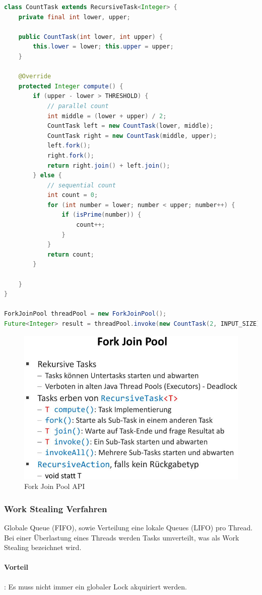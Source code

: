 \begin{lstlisting}[language=java]
class CountTask extends RecursiveTask<Integer> {
	private final int lower, upper; 
	
	public CountTask(int lower, int upper) {
		this.lower = lower; this.upper = upper;
	}
	
	@Override
	protected Integer compute() {
		if (upper - lower > THRESHOLD) { 
			// parallel count
			int middle = (lower + upper) / 2;
			CountTask left = new CountTask(lower, middle); 
			CountTask right = new CountTask(middle, upper);
			left.fork(); 
			right.fork();
			return right.join() + left.join();
		} else {
			// sequential count
			int count = 0;
			for (int number = lower; number < upper; number++) {
				if (isPrime(number)) { 
					count++; 
				}
			}
			return count;
		}

	}
}

ForkJoinPool threadPool = new ForkJoinPool();
Future<Integer> result = threadPool.invoke(new CountTask(2, INPUT_SIZE));
\end{lstlisting}

\begin{figure}[h]
	\centering
	\includegraphics[width=0.7\linewidth]{img/fork_join_pool}
	\caption{Fork Join Pool API}
	\label{fig:forkjoinpool}
\end{figure}

\subsubsection{Work Stealing Verfahren}

Globale Queue (FIFO), sowie Verteilung eine lokale Queues (LIFO) pro Thread. Bei einer Überlastung eines Threads werden Tasks umverteilt, was als Work Stealing bezeichnet wird.

\paragraph{Vorteil}: Es muss nicht immer ein globaler Lock akquiriert werden.


